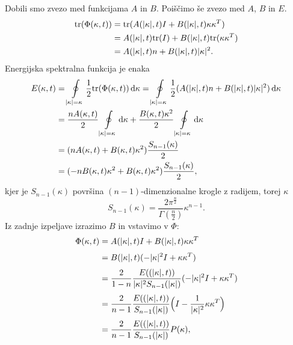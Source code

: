 \documentclass[mat2, tisk]{fmfdelo}
\newcommand{\bd}{\textbf}
\begin{document}
Dobili smo zvezo med funkcijama $A$ in $B$. Poiščimo še zvezo med 
$A$, $B$ in $E$. 
\begin{align*}
\text{tr}(\Phi(\text{\bd{$\kappa$}}, t)) &= \text{tr}(A(|\text{\bd{$\kappa$}}|, t) I + B(|\text{\bd{$\kappa$}}|, t) \text{\bd{$\kappa$}} \text{\bd{$\kappa$}}^T) \\
&= A(|\text{\bd{$\kappa$}}|, t) \text{tr}(I) + B(|\text{\bd{$\kappa$}}|, t) \text{tr}(\text{\bd{$\kappa$}} \text{\bd{$\kappa$}}^T) \\
&= A(|\text{\bd{$\kappa$}}|, t) n + B(|\text{\bd{$\kappa$}}|, t) |\text{\bd{$\kappa$}}|^2.
\end{align*}
Energijska spektralna funkcija je enaka
\begin{align*}
E(\kappa, t) &= \oint\limits_{|\text{\bd{$\kappa$}}| = \kappa} \frac{1}{2} \text{tr}(\Phi(\text{\bd{$\kappa$}}, t)) \dif \text{\bd{$\kappa$}} = \oint\limits_{|\text{\bd{$\kappa$}}| = \kappa} \frac{1}{2} (A(|\text{\bd{$\kappa$}}|, t) n + B(|\text{\bd{$\kappa$}}|, t) |\text{\bd{$\kappa$}}|^2) \dif \text{\bd{$\kappa$}} \\
&= \frac{n A(\kappa, t)}{2} \oint\limits_{|\text{\bd{$\kappa$}}| = \kappa} \dif \text{\bd{$\kappa$}} + \frac{B(\kappa, t) \kappa^2}{2} \oint\limits_{|\text{\bd{$\kappa$}}| = \kappa} \dif \text{\bd{$\kappa$}} \\
&= ({n A(\kappa, t)} + {B(\kappa, t) \kappa^2}) \frac{S_{n-1}(\kappa)}{2} \\
&= ({- n B(\kappa, t)}\kappa^2 + {B(\kappa, t) \kappa^2}) \frac{S_{n-1}(\kappa)}{2},
\end{align*}
kjer je $S_{n-1}(\kappa)$ površina $(n-1)$-dimenzionalne krogle z radijem, torej
$\kappa$ 
$$
S_{n-1}(\kappa) = \frac{2\pi^{\frac{n}{2}}}{\Gamma(\frac{n}{2})} \kappa^{n-1}.
$$
Iz zadnje izpeljave izrazimo $B$ in vstavimo v $\Phi$:
\begin{align}
  \Phi(\text{\bd{$\kappa$}}, t) &= A(|\text{\bd{$\kappa$}}|, t) I + B(|\text{\bd{$\kappa$}}|, t) \text{\bd{$\kappa$}} \text{\bd{$\kappa$}}^T \nonumber\\[1mm]
  &= B(|\text{\bd{$\kappa$}}|, t) (-|\text{\bd{$\kappa$}}|^2 I + \text{\bd{$\kappa$}} \text{\bd{$\kappa$}}^T) \nonumber\\[1mm]
  &= \frac{2}{1-n} \frac{E((|\text{\bd{$\kappa$}}|, t))}{|\text{\bd{$\kappa$}}|^2 S_{n-1}(|\text{\bd{$\kappa$}}|)} (-|\text{\bd{$\kappa$}}|^2 I + \text{\bd{$\kappa$}} \text{\bd{$\kappa$}}^T) \nonumber\\[1mm]
  &= \frac{2}{n-1}\frac{E((|\text{\bd{$\kappa$}}|, t))}{S_{n-1}(|\text{\bd{$\kappa$}}|)} \Big(I - \frac{1}{|\text{\bd{$\kappa$}}|^2}\text{\bd{$\kappa$}} \text{\bd{$\kappa$}}^T\Big) \nonumber\\[1mm]
  &= \frac{2}{n-1} \frac{E((|\text{\bd{$\kappa$}}|, t))}{S_{n-1}(|\text{\bd{$\kappa$}}|)} P(\text{\bd{$\kappa$}}),
\label{hitrostno_spektralni_tenzor_izotropija} %
\end{align}
\end{document}
